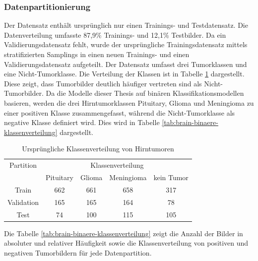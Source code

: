 \newpage

\subsubsection{Datenpartitionierung} \label{chap:brain-datapartition}
Der Datensatz enthält ursprünglich nur einen Trainings- und Testdatensatz. Die Datenverteilung umfasste 87,9\% Trainings- und 12,1\% Testbilder. Da ein Validierungsdatensatz fehlt, wurde der ursprüngliche Trainingsdatensatz mittels stratifizierten Samplings in einen neuen Trainings- und einen Validierungsdatensatz aufgeteilt.  Der Datensatz umfasst drei Tumorklassen und eine Nicht-Tumorklasse. Die Verteilung der Klassen ist in Tabelle \ref{tab:brain-orginale-klassenverteilung} dargestellt. Diese zeigt, dass Tumorbilder deutlich häufiger vertreten sind als Nicht-Tumorbilder. Da die Modelle dieser Thesis auf binären Klassifikationsmodellen basieren, werden die drei Hirntumorklassen Pituitary, Glioma und Meningioma zu einer positiven Klasse zusammengefasst, während die Nicht-Tumorklasse als negative Klasse definiert wird. Dies wird in Tabelle \ref{tab:brain-binaere-klassenverteilung} dargestellt.

\begin{table}[H]
    \centering
    \begin{tabular}{@{}ccccc@{}}
        \toprule
         Partition & \multicolumn{4}{c}{Klassenverteilung}              \\ 
        \cmidrule(l){2-5}
                    & Pituitary & Glioma & Meningioma & kein Tumor      \\ 
        \midrule 
        Train      & 662 & 661 & 658 & 317                              \\
        Validation & 165 & 165 & 164 & 78                               \\
        Test       & 74  & 100 & 115 & 105                              \\ 
        \bottomrule
    \end{tabular}
    \caption{Ursprüngliche Klassenverteilung von Hirntumoren}
    \label{tab:brain-orginale-klassenverteilung}
\end{table}

Die Tabelle \ref{tab:brain-binaere-klassenverteilung} zeigt die Anzahl der Bilder in absoluter und relativer Häufigkeit sowie die Klassenverteilung von positiven und negativen Tumorbildern für jede Datenpartition.

